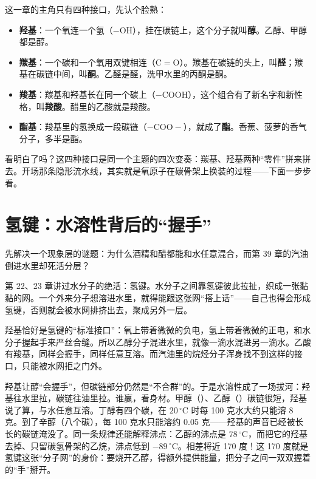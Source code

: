 这一章的主角只有四种接口，先认个脸熟：

\begin{itemize}[itemsep=2pt]
\item \textbf{羟基}：一个氧连一个氢（$-\mathrm{OH}$），挂在碳链上，这个分子就叫\textbf{醇}。乙醇、甲醇都是醇。
\item \textbf{羰基}：一个碳和一个氧用双键相连（$\mathrm{C{=}O}$）。羰基在碳链的头上，叫\textbf{醛}；羰基在碳链中间，叫\textbf{酮}。乙醛是醛，洗甲水里的丙酮是酮。
\item \textbf{羧基}：羰基和羟基长在同一个碳上（$-\mathrm{COOH}$），这个组合有了新名字和新性格，叫\textbf{羧酸}。醋里的乙酸就是羧酸。
\item \textbf{酯基}：羧基里的氢换成一段碳链（$-\mathrm{COO}-$），就成了\textbf{酯}。香蕉、菠萝的香气分子，多半是酯。
\end{itemize}

看明白了吗？这四种接口是同一个主题的四次变奏：羰基、羟基两种“零件”拼来拼去。开场那条隐形流水线，其实就是氧原子在碳骨架上换装的过程——下面一步步看。

\section{氢键：水溶性背后的“握手”}

先解决一个现象层的谜题：为什么酒精和醋都能和水任意混合，而第 39 章的汽油倒进水里却死活分层？

第 22、23 章讲过水分子的绝活：氢键。水分子之间靠氢键彼此拉扯，织成一张黏黏的网。一个外来分子想溶进水里，就得能跟这张网“搭上话”——自己也得会形成氢键，否则就会被水网排挤出去，聚成另外一层。

羟基恰好是氢键的“标准接口”：氧上带着微微的负电，氢上带着微微的正电，和水分子握起手来严丝合缝。所以乙醇分子混进水里，就像一滴水混进另一滴水。乙酸有羧基，同样会握手，同样任意互溶。而汽油里的烷烃分子浑身找不到这样的接口，只能被水网拒之门外。

\begin{qiaoliang}
羟基让醇“会握手”，但碳链部分仍然是“不合群”的。于是水溶性成了一场拔河：羟基往水里拉，碳链往油里拉。谁赢，看身材。甲醇（）、乙醇（）碳链很短，羟基说了算，与水任意互溶。丁醇有四个碳，在 $20\,^{\circ}\mathrm{C}$ 时每 100 克水大约只能溶 8 克。到了辛醇（八个碳），每 100 克水只能溶约 0.05 克——羟基的声音已经被长长的碳链淹没了。同一条规律还能解释沸点：乙醇的沸点是 $78\,^{\circ}\mathrm{C}$，而把它的羟基去掉、只留碳氢骨架的乙烷，沸点低到 $-89\,^{\circ}\mathrm{C}$。相差将近 170 度！这 170 度就是氢键这张“分子网”的身价：要烧开乙醇，得额外提供能量，把分子之间一双双握着的“手”掰开。
\end{qiaoliang}

